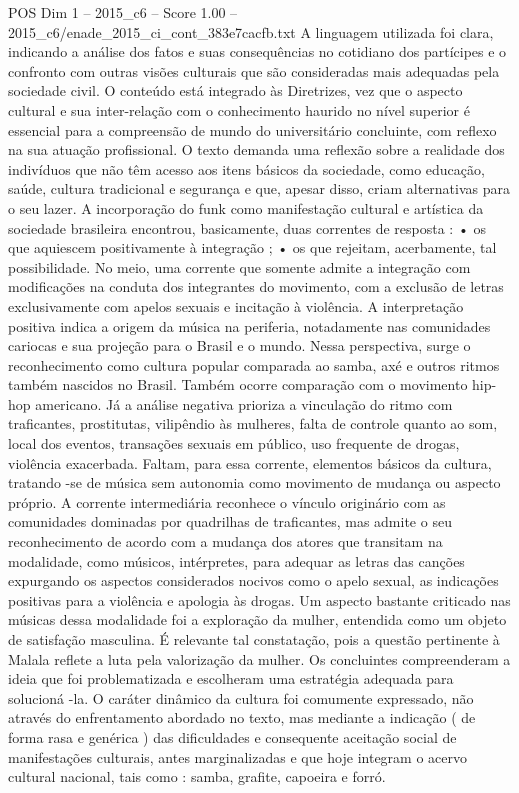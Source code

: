 \begin{textsample}{POS Dim 1 – 2015\_c6 – Score 1.00 – 2015\_c6/enade\_2015\_ci\_cont\_383e7cacfb.txt}
A linguagem utilizada foi clara, indicando a análise dos fatos e suas consequências no cotidiano dos partícipes e o confronto com outras visões culturais que são consideradas mais adequadas pela sociedade civil.
O conteúdo está integrado às Diretrizes, vez que o aspecto cultural e sua inter-relação com o conhecimento haurido no nível superior é essencial para a compreensão de mundo do universitário concluinte, com reflexo na sua atuação profissional.
O texto demanda uma reflexão sobre a realidade dos indivíduos que não têm acesso aos itens básicos da sociedade, como educação, saúde, cultura tradicional e segurança e que, apesar disso, criam alternativas para o seu lazer.
A incorporação do funk como manifestação cultural e artística da sociedade brasileira encontrou, basicamente, duas correntes de resposta : • os que aquiescem positivamente à integração ; • os que rejeitam, acerbamente, tal possibilidade.
No meio, uma corrente que somente admite a integração com modificações na conduta dos integrantes do movimento, com a exclusão de letras exclusivamente com apelos sexuais e incitação à violência.
A interpretação positiva indica a origem da música na periferia, notadamente nas comunidades cariocas e sua projeção para o Brasil e o mundo.
Nessa perspectiva, surge o reconhecimento como cultura popular comparada ao samba, axé e outros ritmos também nascidos no Brasil.
Também ocorre comparação com o movimento hip-hop americano.
Já a análise negativa prioriza a vinculação do ritmo com traficantes, prostitutas, vilipêndio às mulheres, falta de controle quanto ao som, local dos eventos, transações sexuais em público, uso frequente de drogas, violência exacerbada.
Faltam, para essa corrente, elementos básicos da cultura, tratando -se de música sem autonomia como movimento de mudança ou aspecto próprio.
A corrente intermediária reconhece o vínculo originário com as comunidades dominadas por quadrilhas de traficantes, mas admite o seu reconhecimento de acordo com a mudança dos atores que transitam na modalidade, como músicos, intérpretes, para adequar as letras das canções expurgando os aspectos considerados nocivos como o apelo sexual, as indicações positivas para a violência e apologia às drogas.
Um aspecto bastante criticado nas músicas dessa modalidade foi a exploração da mulher, entendida como um objeto de satisfação masculina.
É relevante tal constatação, pois a questão pertinente à Malala reflete a luta pela valorização da mulher.
Os concluintes compreenderam a ideia que foi problematizada e escolheram uma estratégia adequada para solucioná -la.
O caráter dinâmico da cultura foi comumente expressado, não através do enfrentamento abordado no texto, mas mediante a indicação ( de forma rasa e genérica ) das dificuldades e consequente aceitação social de manifestações culturais, antes marginalizadas e que hoje integram o acervo cultural nacional, tais como : samba, grafite, capoeira e forró.

\end{textsample}
